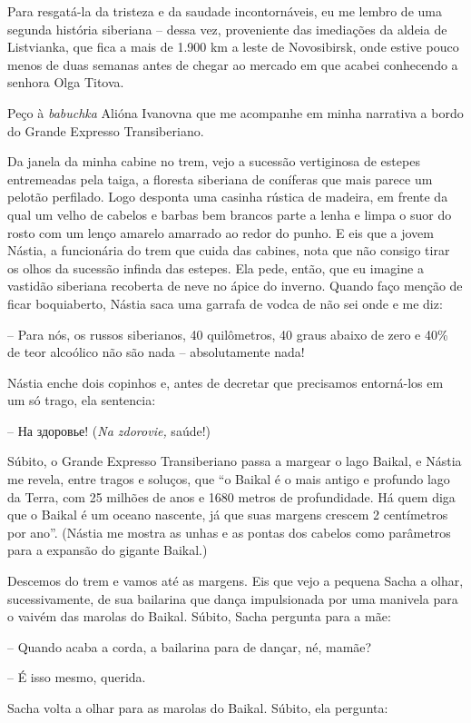 Para resgatá-la da tristeza e da saudade incontornáveis, eu me lembro de
uma segunda história siberiana -- dessa vez, proveniente das imediações
da aldeia de Listvianka, que fica a mais de 1.900 km a leste de
Novosibirsk, onde estive pouco menos de duas semanas antes de chegar ao
mercado em que acabei conhecendo a senhora Olga Titova.

Peço à \emph{babuchka} Alióna Ivanovna que me acompanhe em minha
narrativa a bordo do Grande Expresso Transiberiano.

Da janela da minha cabine no trem, vejo a sucessão vertiginosa de
estepes entremeadas pela taiga, a floresta siberiana de coníferas que
mais parece um pelotão perfilado. Logo desponta uma casinha rústica de
madeira, em frente da qual um velho de cabelos e barbas bem brancos
parte a lenha e limpa o suor do rosto com um lenço amarelo amarrado ao
redor do punho. E eis que a jovem Nástia, a funcionária do trem que
cuida das cabines, nota que não consigo tirar os olhos da sucessão
infinda das estepes. Ela pede, então, que eu imagine a vastidão
siberiana recoberta de neve no ápice do inverno. Quando faço menção de
ficar boquiaberto, Nástia saca uma garrafa de vodca de não sei onde e me
diz:

-- Para nós, os russos siberianos, 40 quilômetros, 40 graus abaixo de
zero e 40\% de teor alcoólico não são nada -- absolutamente nada!

Nástia enche dois copinhos e, antes de decretar que precisamos
entorná-los em um só trago, ela sentencia:

-- На здоровье! (\emph{Na zdorovie,} saúde!)

Súbito, o Grande Expresso Transiberiano passa a margear o lago Baikal, e
Nástia me revela, entre tragos e soluços, que ``o Baikal é o mais antigo
e profundo lago da Terra, com 25 milhões de anos e 1680 metros de
profundidade. Há quem diga que o Baikal é um oceano nascente, já que
suas margens crescem 2 centímetros por ano''. (Nástia me mostra as unhas
e as pontas dos cabelos como parâmetros para a expansão do gigante
Baikal.)

Descemos do trem e vamos até as margens. Eis que vejo a pequena Sacha a
olhar, sucessivamente, de sua bailarina que dança impulsionada por uma
manivela para o vaivém das marolas do Baikal. Súbito, Sacha pergunta
para a mãe:

-- Quando acaba a corda, a bailarina para de dançar, né, mamãe?

-- É isso mesmo, querida.

Sacha volta a olhar para as marolas do Baikal. Súbito, ela pergunta:


